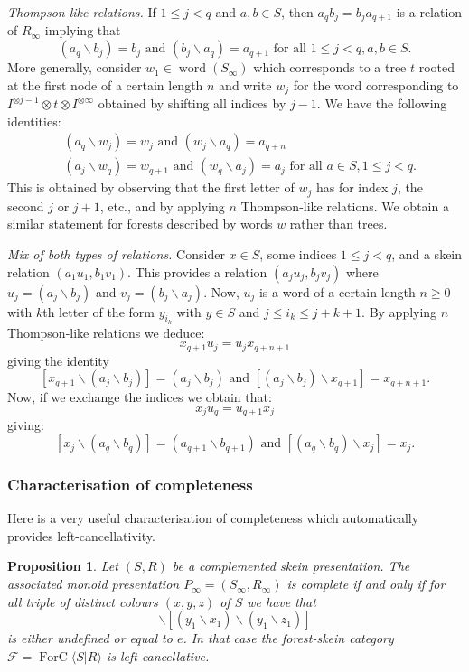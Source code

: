 \documentclass[a4paper, 12pt]{amsart}
\numberwithin{equation}{section}
\newtheorem{proposition}[theorem]{Proposition}
\theoremstyle{definition}
\newcommand{\bs}{\backslash}
\newcommand{\cF}{\mathcal F}
\DeclareMathOperator{\FC}{ForC}
\newcommand{\la}{\langle}
\newcommand{\ot}{\otimes}
\newcommand{\ra}{\rangle}
\DeclareMathOperator{\word}{word}
\begin{document}
{\it Thompson-like relations.}
If $1\leq j<q$ and $a,b\in S$, then $a_q b_j = b_j a_{q+1}$ is a relation of $R_\infty$ implying that 
$$(a_q\bs b_j) = b_j \text{ and } (b_j\bs a_q)=a_{q+1} \text{ for all } 1\leq j<q, a,b\in S.$$
More generally, consider $w_1\in \word(S_\infty)$ which corresponds to a tree $t$ rooted at the first node of a certain length $n$ and write  $w_j$ for the word corresponding to $I^{\ot j-1}\ot t\ot I^{\ot \infty}$ obtained by shifting all indices by $j-1$.
We have the following identities:
\begin{align*}
& (a_q\bs w_j) = w_j \text{ and } (w_j\bs a_q) = a_{q+n}\\
& (a_j\bs w_q) = w_{q+1} \text{ and } (w_q\bs a_j) = a_j \text{ for all } a\in S, 1\leq j<q.
\end{align*}
This is obtained by observing that the first letter of $w_j$ has for index $j$, the second $j$ or $j+1$, etc., and by applying $n$ Thompson-like relations.
We obtain a similar statement for forests described by words $w$ rather than trees.

{\it Mix of both types of relations.}
Consider $x\in S$, some indices $1\leq j<q$, and a skein relation $(a_1 u_1,b_1 v_1)$.
This provides a relation $(a_ju_j,b_jv_j)$ where $u_j=(a_j\bs b_j)$ and $v_j=(b_j\bs a_j)$.
Now, $u_j$ is a word of a certain length $n\geq 0$ with $k$th letter of the form $y_{i_k}$ with $y\in S$ and $j\leq i_k\leq j+k+1.$
By applying $n$ Thompson-like relations we deduce:
$$x_{q+1} u_j = u_j x_{q+n+1}$$ giving the identity
$$[x_{q+1}\bs ( a_j\bs b_j)] =(a_j\bs b_j) \text{ and } [(a_j\bs b_j)\bs x_{q+1}] = x_{q+n+1}.$$
Now, if we exchange the indices we obtain that:
$$x_j u_{q} = u_{q+1} x_j$$ giving:
$$[x_j\bs (a_q\bs b_q)] = (a_{q+1}\bs b_{q+1}) \text{ and } [(a_q\bs b_q)\bs x_j] = x_j.$$

\subsubsection{Characterisation of completeness}

Here is a very useful characterisation of completeness which automatically provides left-cancellativity.

\begin{proposition}\label{prop:LC-complemented}
Let $(S,R)$ be a complemented skein presentation.
The associated monoid presentation $P_\infty=(S_\infty,R_\infty)$ is complete if and only if 
for all triple of {\it distinct} colours $(x,y,z)$ of $S$ we have that
\begin{equation*}[(x_1\bs y_1)\bs (x_1\bs z_1)]\bs [(y_1\bs x_1)\bs (y_1\bs z_1)]\end{equation*}
is either undefined or equal to $e$.
In that case the forest-skein category $\cF=\FC\la S|R\ra$ is left-cancellative.
\end{proposition}
\end{document}
